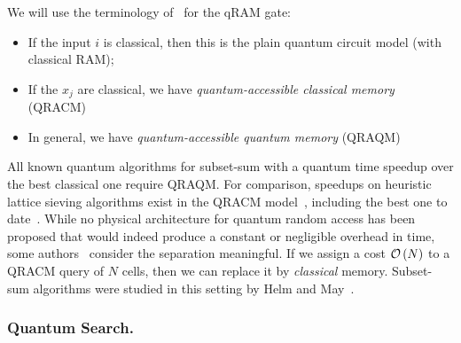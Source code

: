 We will use the terminology of~\cite{DBLP:conf/tqc/Kuperberg13} for the qRAM gate:
\begin{itemize}
\item If the input $i$ is classical, then this is the plain quantum circuit model (with classical RAM);
\item If the $x_j$ are classical, we have \emph{quantum-accessible classical memory} (QRACM)
\item In general, we have \emph{quantum-accessible quantum memory} (QRAQM)
\end{itemize}

All known quantum algorithms for subset-sum with a quantum time speedup over the best classical one require QRAQM. For comparison, speedups on heuristic lattice sieving algorithms exist in the QRACM model~\cite{DBLP:journals/dcc/LaarhovenMP15,DBLP:conf/asiacrypt/KirshanovaMPM19}, including the best one to date~\cite{laarhoven2015search}. While no physical architecture for quantum random access has been proposed that would indeed produce a constant or negligible overhead in time, some authors~\cite{DBLP:conf/tqc/Kuperberg13} consider the separation meaningful. If we assign a cost $\mathcal{O} \left(N \right)$ to a QRACM query of $N$ cells, then we can replace it by \emph{classical} memory. Subset-sum algorithms were studied in this setting by Helm and May~\cite{DBLP:conf/pqcrypto/Helm020}.





\subsubsection{Quantum Search.}

